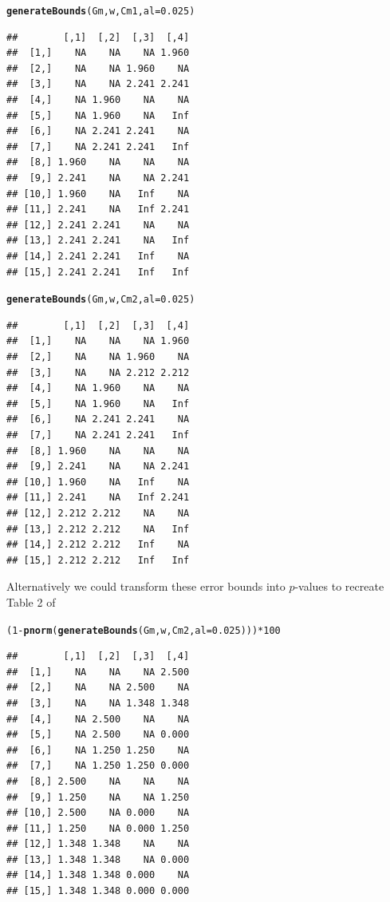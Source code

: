 \documentclass[a4paper, 11pt]{article}\usepackage[]{graphicx}\usepackage[]{color}
\makeatletter
\newcommand{\hlnum}[1]{\textcolor[rgb]{0.686,0.059,0.569}{#1}}%
\newcommand{\hlopt}[1]{\textcolor[rgb]{0,0,0}{#1}}%
\newcommand{\hlstd}[1]{\textcolor[rgb]{0.345,0.345,0.345}{#1}}%
\newcommand{\hlkwc}[1]{\textcolor[rgb]{0.333,0.667,0.333}{#1}}%
\newcommand{\hlkwd}[1]{\textcolor[rgb]{0.737,0.353,0.396}{\textbf{#1}}}%
\newenvironment{kframe}{%
 \def\at@end@of@kframe{}%
 \ifinner\ifhmode%
  \def\at@end@of@kframe{\end{minipage}}%
  \begin{minipage}{\columnwidth}%
 \fi\fi%
 \def\FrameCommand##1{\hskip\@totalleftmargin \hskip-\fboxsep
 \colorbox{shadecolor}{##1}\hskip-\fboxsep
     \hskip-\linewidth \hskip-\@totalleftmargin \hskip\columnwidth}%
 \MakeFramed {\advance\hsize-\width
   \@totalleftmargin\z@ \linewidth\hsize
   \@setminipage}}%
 {\par\unskip\endMakeFramed%
 \at@end@of@kframe}
\newenvironment{knitrout}{}{} %
\makeatother
\begin{document}
\begin{knitrout}
\color{fgcolor}\begin{kframe}
\begin{alltt}
\hlkwd{generateBounds}\hlstd{(Gm, w, Cm1,} \hlkwc{al} \hlstd{=} \hlnum{0.025}\hlstd{)}
\end{alltt}
\begin{verbatim}
##        [,1]  [,2]  [,3]  [,4]
##  [1,]    NA    NA    NA 1.960
##  [2,]    NA    NA 1.960    NA
##  [3,]    NA    NA 2.241 2.241
##  [4,]    NA 1.960    NA    NA
##  [5,]    NA 1.960    NA   Inf
##  [6,]    NA 2.241 2.241    NA
##  [7,]    NA 2.241 2.241   Inf
##  [8,] 1.960    NA    NA    NA
##  [9,] 2.241    NA    NA 2.241
## [10,] 1.960    NA   Inf    NA
## [11,] 2.241    NA   Inf 2.241
## [12,] 2.241 2.241    NA    NA
## [13,] 2.241 2.241    NA   Inf
## [14,] 2.241 2.241   Inf    NA
## [15,] 2.241 2.241   Inf   Inf
\end{verbatim}
\begin{alltt}
\hlkwd{generateBounds}\hlstd{(Gm, w, Cm2,} \hlkwc{al} \hlstd{=} \hlnum{0.025}\hlstd{)}
\end{alltt}
\begin{verbatim}
##        [,1]  [,2]  [,3]  [,4]
##  [1,]    NA    NA    NA 1.960
##  [2,]    NA    NA 1.960    NA
##  [3,]    NA    NA 2.212 2.212
##  [4,]    NA 1.960    NA    NA
##  [5,]    NA 1.960    NA   Inf
##  [6,]    NA 2.241 2.241    NA
##  [7,]    NA 2.241 2.241   Inf
##  [8,] 1.960    NA    NA    NA
##  [9,] 2.241    NA    NA 2.241
## [10,] 1.960    NA   Inf    NA
## [11,] 2.241    NA   Inf 2.241
## [12,] 2.212 2.212    NA    NA
## [13,] 2.212 2.212    NA   Inf
## [14,] 2.212 2.212   Inf    NA
## [15,] 2.212 2.212   Inf   Inf
\end{verbatim}
\end{kframe}
\end{knitrout}


Alternatively we could transform these error bounds into $p$-values to
recreate Table 2 of \cite{Bretz11}

\begin{knitrout}
\color{fgcolor}\begin{kframe}
\begin{alltt}
\hlstd{(}\hlnum{1} \hlopt{-} \hlkwd{pnorm}\hlstd{(}\hlkwd{generateBounds}\hlstd{(Gm, w, Cm2,} \hlkwc{al} \hlstd{=} \hlnum{0.025}\hlstd{)))} \hlopt{*} \hlnum{100}
\end{alltt}
\begin{verbatim}
##        [,1]  [,2]  [,3]  [,4]
##  [1,]    NA    NA    NA 2.500
##  [2,]    NA    NA 2.500    NA
##  [3,]    NA    NA 1.348 1.348
##  [4,]    NA 2.500    NA    NA
##  [5,]    NA 2.500    NA 0.000
##  [6,]    NA 1.250 1.250    NA
##  [7,]    NA 1.250 1.250 0.000
##  [8,] 2.500    NA    NA    NA
##  [9,] 1.250    NA    NA 1.250
## [10,] 2.500    NA 0.000    NA
## [11,] 1.250    NA 0.000 1.250
## [12,] 1.348 1.348    NA    NA
## [13,] 1.348 1.348    NA 0.000
## [14,] 1.348 1.348 0.000    NA
## [15,] 1.348 1.348 0.000 0.000
\end{verbatim}
\end{kframe}
\end{knitrout}
\end{document}
